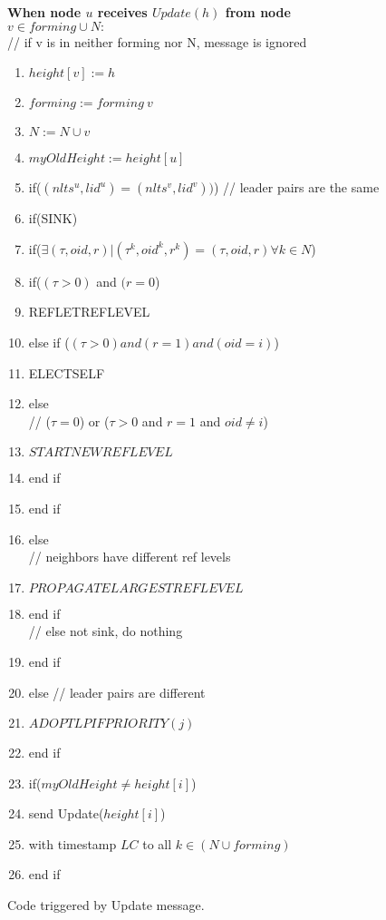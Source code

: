 \begin{figure}

\textbf{When node $u$ receives $Update(h)$ from node $v \in forming \cup N:$}
\\ \quad \quad // if v is in neither forming nor N, message is ignored
\begin{enumerate}

\item \quad$height[v] := h$
\item \quad$forming := forming \ {v}$
\item \quad$N := N ∪ {v}$
\item \quad$myOldHeight := height[u]$
\item \quad if($(nlts^u ,lid^u ) = (nlts^v ,lid^v ))$) // leader pairs are the same
\item \quad \quad if(SINK)
\item \quad \quad \quad if($\exists (\tau , oid, r) | (\tau ^k, oid^k, r^k) = (\tau , oid, r) \forall k \in N $)
\item \quad \quad \quad \quad if($(\tau > 0)$ and $(r = 0$)
\item \quad \quad \quad \quad \quad REFLETREFLEVEL
\item \quad \quad \quad \quad else if ($(\tau > 0) and (r = 1) and (oid = i)$)
\item \quad \quad \quad \quad \quad ELECTSELF
\item \quad \quad \quad \quad else
\\ // ($\tau = 0$) or ($\tau >0$ and $r=1$ and $oid \neq i$)
\item \quad \quad \quad \quad \quad $STARTNEWREFLEVEL$
\item \quad \quad \quad \quad  end if
\item \quad \quad \quad end if
\item \quad \quad else
\\ // neighbors have different ref levels
\item \quad \quad \quad $PROPAGATELARGESTREFLEVEL$
\item \quad \quad end if
\\ // else not sink, do nothing
\item \quad end if
\item else // leader pairs are different
\item \quad $ADOPTLPIFPRIORITY(j)$
\item  end if
\item if($myOldHeight \neq height[i]$)
\item \quad send Update($height[i]$)
\item \quad with timestamp $LC$ to all $k \in (N \cup forming)$
\item end if
\end{enumerate}
\caption{Code triggered by Update message.}
\end{figure}